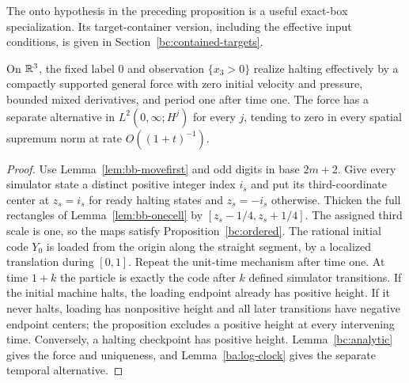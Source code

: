 The onto hypothesis in the preceding proposition is a useful exact-box
specialization. Its target-container version, including the effective
input conditions, is given in Section~\ref{bc:contained-targets}.

\begin{theorem}\label{bc:positive-height}
On $\mathbb R^3$, the fixed label $0$ and observation $\{x_3>0\}$ realize
halting effectively by a compactly supported general force with zero
initial velocity and pressure, bounded mixed derivatives, and period one
after time one. The force has a separate alternative in
$L^2(0,\infty;H^j)$ for every $j$, tending to zero in every spatial
supremum norm at rate $O((1+t)^{-1})$.
\end{theorem}
\begin{proof}\label{bc:positive-height-proof}
Use Lemma~\ref{lem:bb-movefirst} and odd digits in base $2m+2$. Give every
simulator state a distinct positive integer index $i_s$ and put its
third-coordinate center at $z_s=i_s$ for ready halting states and
$z_s=-i_s$ otherwise. Thicken the full rectangles of
Lemma~\ref{lem:bb-onecell} by $[z_s-1/4,z_s+1/4]$. The assigned third
scale is one, so the maps satisfy Proposition~\ref{bc:ordered}.
The rational initial code $Y_0$ is loaded from the origin along the
straight segment, by a localized translation during $[0,1]$. Repeat the
unit-time mechanism after time one. At time $1+k$ the particle is exactly
the code after $k$ defined simulator transitions. If the initial machine
halts, the loading endpoint already has positive height. If it never
halts, loading has nonpositive height and all later transitions have
negative endpoint centers; the proposition excludes a positive height
at every intervening time. Conversely, a halting checkpoint has positive
height. Lemma~\ref{bc:analytic} gives the force and uniqueness, and
Lemma~\ref{ba:log-clock} gives the separate temporal alternative.
\end{proof}

